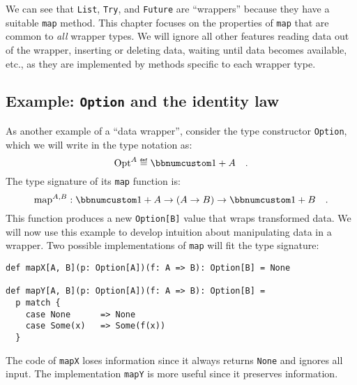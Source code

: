 We can see that \lstinline!List!, \lstinline!Try!, and \lstinline!Future!
are \textsf{``}wrappers\textsf{''} because they have a suitable \lstinline!map! method.
This chapter focuses on the properties of \lstinline!map! that are
common to \emph{all} wrapper types. We will ignore all other features
\textemdash{} reading data out of the wrapper, inserting or deleting
data, waiting until data becomes available, etc., \textemdash{} as
they are implemented by methods specific to each wrapper type.

\subsection{Example: \texttt{Option} and the identity law\label{subsec:f-Example:-Option-and}}

As another example of a \textsf{``}data wrapper\textsf{''}, consider the type constructor
\lstinline!Option!, which we will write in the type notation as:
\[
\text{Opt}^{A}\triangleq\bbnum 1+A\quad.
\]
The type signature of its \lstinline!map! function is:
\[
\text{map}^{A,B}:\bbnum 1+A\rightarrow\left(A\rightarrow B\right)\rightarrow\bbnum 1+B\quad.
\]
This function produces a new \lstinline!Option[B]! value that wraps
transformed data. We will now use this example to develop intuition
about manipulating data in a wrapper. Two possible implementations
of \lstinline!map! will fit the type signature:
\begin{lstlisting}
def mapX[A, B](p: Option[A])(f: A => B): Option[B] = None

def mapY[A, B](p: Option[A])(f: A => B): Option[B] =
  p match {
    case None      => None
    case Some(x)   => Some(f(x))
  }
\end{lstlisting}
The code of \lstinline!mapX! loses information
since it always returns \lstinline!None! and ignores all input. The
implementation \lstinline!mapY! is more useful since it preserves
information. 

